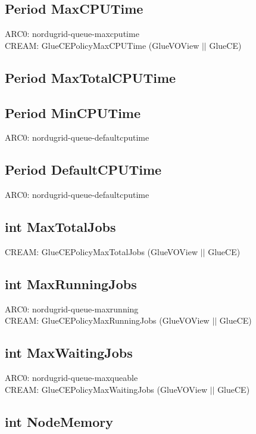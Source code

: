 \documentclass{book}
\begin{document}
\subsection*{Period MaxCPUTime}

ARC0: nordugrid-queue-maxcputime \\
CREAM: GlueCEPolicyMaxCPUTime (GlueVOView $||$ GlueCE)

\subsection*{Period MaxTotalCPUTime}

\subsection*{Period MinCPUTime}

ARC0: nordugrid-queue-defaultcputime

\subsection*{Period DefaultCPUTime}

ARC0: nordugrid-queue-defaultcputime

\subsection*{int MaxTotalJobs}

CREAM: GlueCEPolicyMaxTotalJobs (GlueVOView $||$ GlueCE)

\subsection*{int MaxRunningJobs}

ARC0: nordugrid-queue-maxrunning \\
CREAM: GlueCEPolicyMaxRunningJobs (GlueVOView $||$ GlueCE)

\subsection*{int MaxWaitingJobs}

ARC0: nordugrid-queue-maxqueable \\
CREAM: GlueCEPolicyMaxWaitingJobs (GlueVOView $||$ GlueCE)

\subsection*{int NodeMemory}
\end{document}
